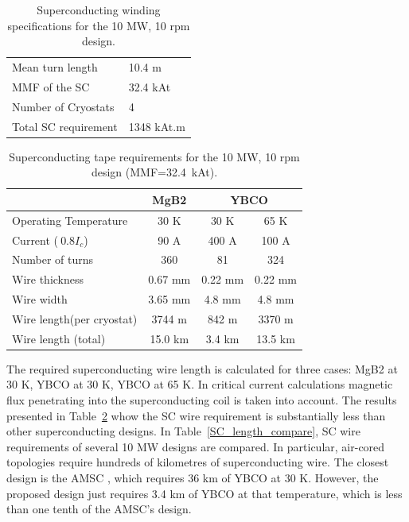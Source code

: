 \documentclass[12pt]{iopart}
\begin{document}
\begin{table}[]
  \centering
  \begin{tabular}{ll}
\hline
Mean turn length & 10.4 m \\
MMF of the SC & 32.4 kAt \\
Number of Cryostats & 4 \\
Total SC requirement & 1348 kAt.m \\
\hline
 \end{tabular}
  \caption{Superconducting winding specifications for the 10 MW, 10 rpm design.}
  \label{10MW_hts_spec}
\end{table}

\begin{table}[t]
  \centering
  \begin{tabular}{lccc}
& MgB2 & \multicolumn{2}{c}{YBCO} \\
\hline
Operating Temperature & 30 K & 30 K & 65 K \\
Current ($~0.8I_c$) & 90 A & 400 A & 100 A \\
Number of turns & 360 & 81 & 324 \\
Wire thickness & 0.67 mm & 0.22 mm & 0.22 mm \\
Wire width & 3.65 mm & 4.8 mm & 4.8 mm \\
Wire length(per cryostat) & 3744 m & 842 m & 3370 m \\
Wire length (total) & 15.0 km & 3.4 km & 13.5 km \\
\hline
 \end{tabular}
  \caption{Superconducting tape requirements for the 10 MW, 10 rpm design (MMF=32.4~kAt).}
  \label{10MW_hts_wire_spec}
\end{table}


The required superconducting wire length is calculated for three cases: MgB2 at 30 K, YBCO at 30 K, YBCO at 65 K. In critical current calculations magnetic flux penetrating into the superconducting coil is taken into account. The results presented in Table~\ref{10MW_hts_wire_spec} whow the SC wire requirement is substantially less than other superconducting designs. In Table~\ref{SC_length_compare}, SC wire requirements of several 10 MW designs are compared. In particular, air-cored topologies require hundreds of kilometres of superconducting wire. The closest design is the AMSC \cite{Snitchler2011}, which requires 36 km of YBCO at 30 K. However, the proposed design just requires 3.4 km of YBCO at that temperature, which is less than one tenth of the AMSC's design.
\end{document}
